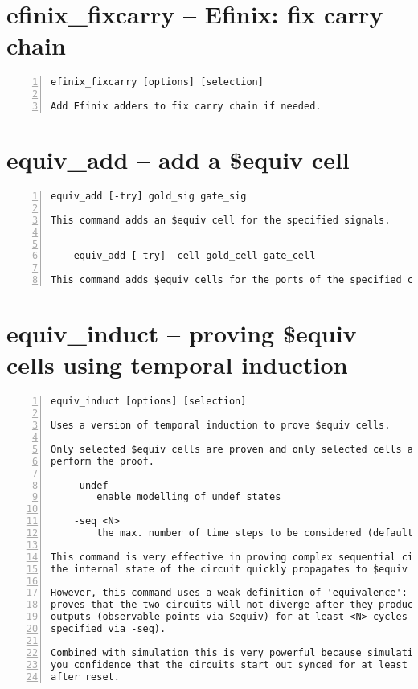 \section{efinix\_fixcarry -- Efinix: fix carry chain}
\label{cmd:efinix_fixcarry}
\begin{lstlisting}[numbers=left,frame=single]
    efinix_fixcarry [options] [selection]

Add Efinix adders to fix carry chain if needed.
\end{lstlisting}

\section{equiv\_add -- add a \$equiv cell}
\label{cmd:equiv_add}
\begin{lstlisting}[numbers=left,frame=single]
    equiv_add [-try] gold_sig gate_sig

This command adds an $equiv cell for the specified signals.


    equiv_add [-try] -cell gold_cell gate_cell

This command adds $equiv cells for the ports of the specified cells.
\end{lstlisting}

\section{equiv\_induct -- proving \$equiv cells using temporal induction}
\label{cmd:equiv_induct}
\begin{lstlisting}[numbers=left,frame=single]
    equiv_induct [options] [selection]

Uses a version of temporal induction to prove $equiv cells.

Only selected $equiv cells are proven and only selected cells are used to
perform the proof.

    -undef
        enable modelling of undef states

    -seq <N>
        the max. number of time steps to be considered (default = 4)

This command is very effective in proving complex sequential circuits, when
the internal state of the circuit quickly propagates to $equiv cells.

However, this command uses a weak definition of 'equivalence': This command
proves that the two circuits will not diverge after they produce equal
outputs (observable points via $equiv) for at least <N> cycles (the <N>
specified via -seq).

Combined with simulation this is very powerful because simulation can give
you confidence that the circuits start out synced for at least <N> cycles
after reset.
\end{lstlisting}

